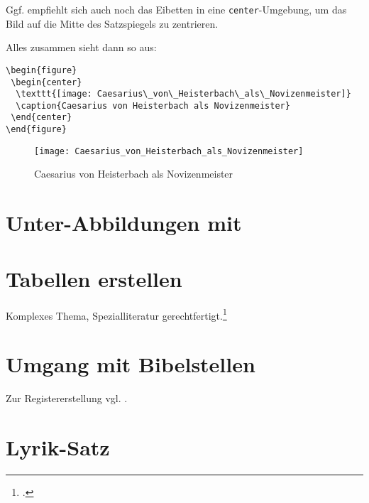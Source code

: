 Ggf. empfiehlt sich auch noch das Eibetten in eine \lstinline/center/-Umgebung,
um das Bild auf die Mitte des Satzspiegels zu zentrieren.

Alles zusammen sieht dann so aus:

\begin{lstlisting}
\begin{figure}
 \begin{center}
  \texttt{[image: Caesarius\_von\_Heisterbach\_als\_Novizenmeister]}
  \caption{Caesarius von Heisterbach als Novizenmeister}
 \end{center}
\end{figure} 
\end{lstlisting}


\begin{figure}[!htb]
\centering
  \texttt{[image: Caesarius\_von\_Heisterbach\_als\_Novizenmeister]}
  \caption{Caesarius von Heisterbach als Novizenmeister}
\end{figure}

\section{Unter-Abbildungen mit \protect{}}


\section{Tabellen erstellen}

Komplexes Thema, Spezialliteratur gerechtfertigt.\footcite{voss:tabellen}







\section{Umgang mit Bibelstellen}




Zur Registererstellung vgl. .


\section{Lyrik-Satz}
 

